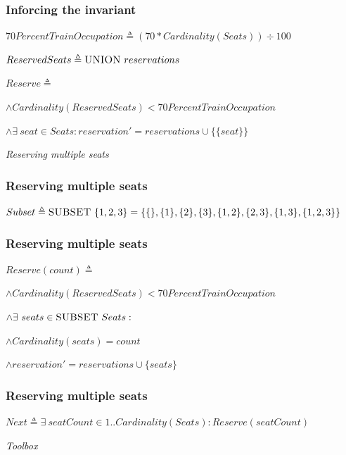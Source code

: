 \documentclass{beamer}
\begin{document}
\begin{frame}
  \frametitle{Inforcing the invariant}
  
  $70PercentTrainOccupation \triangleq (70 * Cardinality(Seats)) \div 100$
  
  $ReservedSeats \triangleq \textsc{UNION}\ reservations$
  
  $Reserve \triangleq$
  
  $\land Cardinality(ReservedSeats) < 70PercentTrainOccupation$
  
  $\land \exists\ seat \in Seats : reservation' = reservations \cup \{\{seat\}\}$
\end{frame}

\begin{frame}
  \centering \Huge \emph{Reserving multiple seats}
\end{frame}

\begin{frame}
  \frametitle{Reserving multiple seats}
  
  $Subset \triangleq \textsc{SUBSET}\ \{1, 2, 3\} = \{\{\}, \{1\}, \{2\}, \{3\}, \{1, 2\}, \{2, 3\}, \{1, 3\}, \{1, 2, 3\}\}$
\end{frame}

\begin{frame}
  \frametitle{Reserving multiple seats}
  
  $Reserve(count) \triangleq$
  
  $\land Cardinality(ReservedSeats) < 70PercentTrainOccupation$
  
  $\land \exists\ seats \in \textsc{SUBSET}\ Seats :$
  
  $\land Cardinality(seats) = count$
  
  $\land reservation' = reservations \cup \{seats\}$
\end{frame}

\begin{frame}
  \frametitle{Reserving multiple seats}
  
  $Next \triangleq \exists\ seatCount \in 1..Cardinality(Seats) : Reserve(seatCount)$
\end{frame}

\begin{frame}
  \centering \Huge \emph{Toolbox}
\end{frame}
\end{document}
